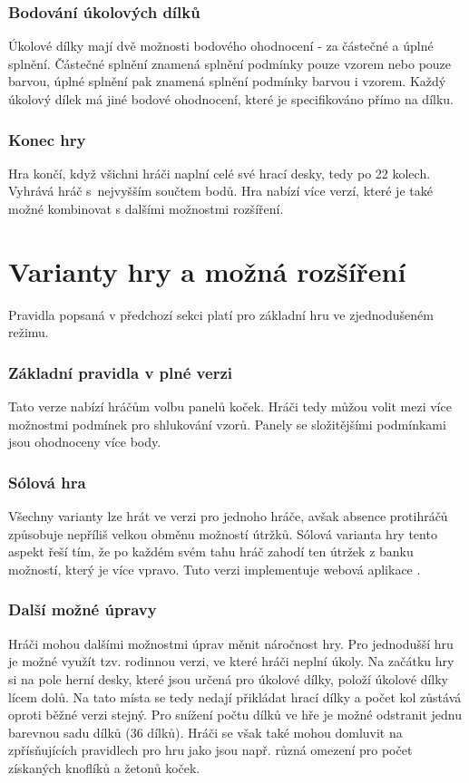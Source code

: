\subsubsection*{Bodování úkolových dílků}
Úkolové dílky mají dvě možnosti bodového ohodnocení - za částečné a úplné splnění. Částečné splnění znamená splnění podmínky pouze vzorem nebo pouze barvou, úplné splnění pak znamená splnění podmínky barvou i vzorem. Každý úkolový dílek má jiné bodové ohodnocení, které je specifikováno přímo na dílku.


\subsubsection*{Konec hry}

Hra končí, když všichni hráči naplní celé své hrací desky, tedy po 22 kolech. Vyhrává hráč s~nejvyšším součtem bodů. Hra nabízí více verzí, které je také možné kombinovat s dalšími možnostmi rozšíření.


\section{Varianty hry a možná rozšíření}

Pravidla popsaná v předchozí sekci platí pro základní hru ve zjednodušeném režimu.

\subsubsection*{Základní pravidla v plné verzi}
Tato verze nabízí hráčům volbu panelů koček. Hráči tedy můžou volit mezi více možnostmi podmínek pro shlukování vzorů. Panely se složitějšími podmínkami jsou ohodnoceny více body.

\subsubsection*{Sólová hra}
Všechny varianty lze hrát ve verzi pro jednoho hráče, avšak absence protihráčů způsobuje nepříliš velkou obměnu možností útržků. Sólová varianta hry tento aspekt řeší tím, že po každém svém tahu hráč zahodí ten útržek z banku možností, který je více vpravo. Tuto verzi implementuje webová aplikace \citep{calicoGame}.

\subsubsection*{Další možné úpravy}
Hráči mohou dalšími možnostmi úprav měnit náročnost hry. Pro jednodušší hru je možné využít tzv. rodinnou verzi, ve které hráči neplní úkoly. Na začátku hry si na pole herní desky, které jsou určená pro úkolové dílky, položí úkolové dílky lícem dolů. Na tato místa se tedy nedají přikládat hrací dílky a počet kol zůstává oproti běžné verzi stejný. Pro snížení počtu dílků ve hře je možné odstranit jednu barevnou sadu dílků (36 dílků). Hráči se však také mohou domluvit na zpřísňujících pravidlech pro hru jako jsou např. různá omezení pro počet získaných knoflíků a žetonů koček.


